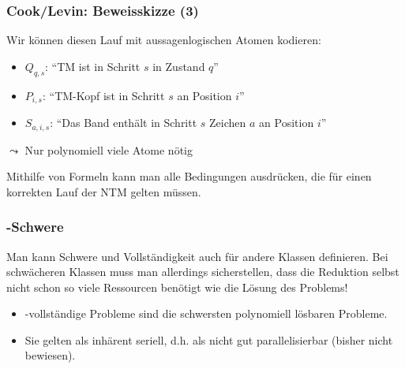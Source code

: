 \documentclass[aspectratio=1610,onlymath]{beamer}
\begin{document}
\begin{frame}\frametitle{Cook/Levin: Beweisskizze (3)}

Wir können diesen Lauf mit aussagenlogischen Atomen kodieren:
\begin{itemize}
\item $Q_{q,s}$: "`TM ist in Schritt $s$ in Zustand $q$"'
% 
\item $P_{i,s}$: "`TM-Kopf ist in Schritt $s$ an Position $i$"'
\item $S_{a,i,s}$: "`Das Band enthält in Schritt $s$ Zeichen $a$ an Position $i$"'
\end{itemize}
$\leadsto$ Nur polynomiell viele Atome nötig
\bigskip

Mithilfe von Formeln kann man alle Bedingungen ausdrücken, die für einen korrekten Lauf der NTM gelten müssen.

\medskip



\end{frame}

\begin{frame}\frametitle{-Schwere}

Man kann Schwere und Vollständigkeit auch für andere Klassen definieren. Bei schwächeren Klassen
muss man allerdings sicherstellen, dass die Reduktion selbst nicht schon so viele Ressourcen benötigt wie
die Lösung des Problems!

\pause

\begin{itemize}
\item {}-vollständige Probleme sind die schwersten polynomiell lösbaren Probleme.
\item Sie gelten als inhärent seriell, d.h. als nicht gut parallelisierbar (bisher nicht bewiesen).
\end{itemize}\pause


\end{frame}
\end{document}
